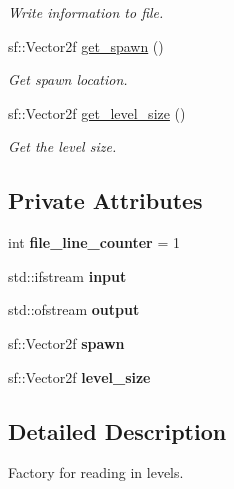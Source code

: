 \begin{DoxyCompactItemize}
\begin{DoxyCompactList}\small\item\em Write information to file. \end{DoxyCompactList}\item 
sf\+::\+Vector2f \hyperlink{classfactory_a3c3a039b8f76a947267dbe659166550b}{get\+\_\+spawn} ()
\begin{DoxyCompactList}\small\item\em Get spawn location. \end{DoxyCompactList}\item 
sf\+::\+Vector2f \hyperlink{classfactory_af9bb026273b34fc032ca5ac73d457611}{get\+\_\+level\+\_\+size} ()
\begin{DoxyCompactList}\small\item\em Get the level size. \end{DoxyCompactList}\end{DoxyCompactItemize}
\subsection*{Private Attributes}
\begin{DoxyCompactItemize}
\item 
\mbox{\label{classfactory_af33b0e5fcc396c359d30a00afacb819b}} 
int {\bfseries file\+\_\+line\+\_\+counter} = 1
\item 
\mbox{\label{classfactory_a9a874663e858e01c8ff372c070b8c19e}} 
std\+::ifstream {\bfseries input}
\item 
\mbox{\label{classfactory_a0454b8bf0f45196f436ddf3febc422f3}} 
std\+::ofstream {\bfseries output}
\item 
\mbox{\label{classfactory_a891028263226aa493299e51f767211a1}} 
sf\+::\+Vector2f {\bfseries spawn}
\item 
\mbox{\label{classfactory_a29d1328317de4563aefb5c2f32f63424}} 
sf\+::\+Vector2f {\bfseries level\+\_\+size}
\end{DoxyCompactItemize}


\subsection{Detailed Description}
Factory for reading in levels. 

